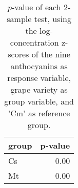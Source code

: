 \begin{table}[ht]
\centering
\begin{tabular}{lr}
  \hline
group & p-value \\ 
  \hline
Cs & 0.00 \\ 
  Mt & 0.00 \\ 
   \hline
\end{tabular}
\caption{
            $p$-value of each 2-sample test, using the log-concentration 
            z-scores of the nine anthocyanins as response variable, 
            grape variety as group variable, and 'Cm' 
            as reference group.
        } 
\label{tbl:1}
\end{table}
